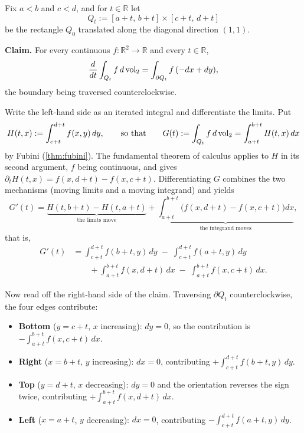 \begin{example}
\label{ex:moving_rectangle_derivative}
Fix $a < b$ and $c < d$, and for $t \in \mathbb{R}$ let
\[Q_t := [a+t,\,b+t] \times [c+t,\,d+t]\]
be the rectangle $Q_0$ translated along the diagonal direction $(1,1)$.

\textbf{Claim.} For every continuous $f : \mathbb{R}^2 \to \mathbb{R}$ and every $t \in \mathbb{R}$,
\[\frac{d}{dt}\int_{Q_t} f \,d\operatorname{vol}_2 = \int_{\partial Q_t} f\,(-dx + dy),\]
the boundary being traversed counterclockwise.

Write the left-hand side as an iterated integral and differentiate the limits. Put
\[H(t,x) := \int_{c+t}^{d+t} f(x,y)\,dy, \qquad \text{so that} \qquad
  G(t) := \int_{Q_t} f\,d\operatorname{vol}_2 = \int_{a+t}^{b+t} H(t,x)\,dx\]
by Fubini (\cref{thm:fubini}). The fundamental theorem of calculus applies to $H$ in its second
argument, $f$ being continuous, and gives
$\partial_t H(t,x) = f(x,d+t) - f(x,c+t)$. Differentiating $G$ combines the two mechanisms
(moving limits and a moving integrand) and yields
\[G'(t) = \underbrace{H(t,b+t) - H(t,a+t)}_{\text{the limits move}}
        + \underbrace{\int_{a+t}^{b+t}\big(f(x,d+t)-f(x,c+t)\big)dx}_{\text{the integrand moves}},\]
that is,
\begin{align*}
G'(t) &= \int_{c+t}^{d+t} f(b+t,y)\,dy \;-\; \int_{c+t}^{d+t} f(a+t,y)\,dy \\
      &\qquad + \int_{a+t}^{b+t} f(x,d+t)\,dx \;-\; \int_{a+t}^{b+t} f(x,c+t)\,dx.
\end{align*}

Now read off the right-hand side of the claim. Traversing $\partial Q_t$ counterclockwise, the four
edges contribute:

\begin{itemize}
  \item \textbf{Bottom} ($y = c+t$, $x$ increasing): $dy = 0$, so the contribution is
    $-\int_{a+t}^{b+t} f(x,c+t)\,dx$.
  \item \textbf{Right} ($x = b+t$, $y$ increasing): $dx = 0$, contributing
    $+\int_{c+t}^{d+t} f(b+t,y)\,dy$.
  \item \textbf{Top} ($y = d+t$, $x$ decreasing): $dy = 0$ and the orientation reverses the sign
    twice, contributing $+\int_{a+t}^{b+t} f(x,d+t)\,dx$.
  \item \textbf{Left} ($x = a+t$, $y$ decreasing): $dx = 0$, contributing
    $-\int_{c+t}^{d+t} f(a+t,y)\,dy$.
\end{itemize}


\end{example}
